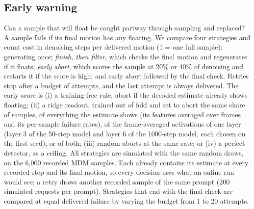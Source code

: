 \subsection{Early warning}
\label{sec:earlymethod}
Can a sample that will float be caught partway through sampling and replaced? A sample fails if its final motion has any floating. We compare four strategies and count cost in denoising steps per delivered motion (1 = one full sample): generating once; \emph{finish, then filter}, which checks the final motion and regenerates if it floats; \emph{early abort}, which scores the sample at 20\% or 40\% of denoising and restarts it if the score is high; and early abort followed by the final check. Retries stop after a budget of attempts, and the last attempt is always delivered. The early score is (i) a training-free rule, abort if the decoded estimate already shows floating; (ii) a ridge readout, trained out of fold and set to abort the same share of samples, of everything the estimate shows (its features averaged over frames and its per-sample failure rates), of the frame-averaged activations of one layer (layer 3 of the 50-step model and layer 6 of the 1000-step model, each chosen on the first seed), or of both; (iii) random aborts at the same rate; or (iv) a perfect detector, as a ceiling. All strategies are simulated with the same random draws, on the 6,000 recorded MDM samples. Each already contains its estimate at every recorded step and its final motion, so every decision uses what an online run would see; a retry draws another recorded sample of the same prompt (200 simulated requests per prompt). Strategies that end with the final check are compared at equal delivered failure by varying the budget from 1 to 20 attempts.
